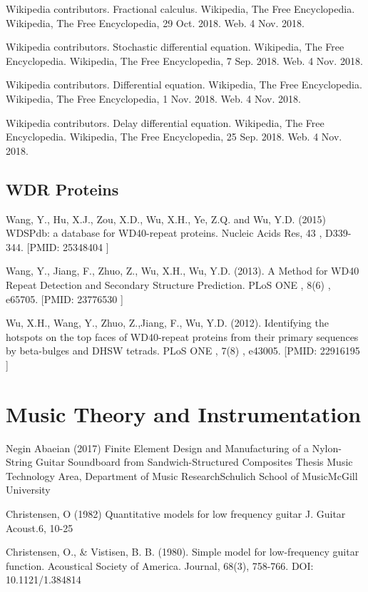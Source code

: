 \begin{thebibliography}{00}
 Wikipedia contributors. 
\newblock Fractional calculus.
\newblock Wikipedia, The Free Encyclopedia. Wikipedia, The Free Encyclopedia, 29 Oct. 2018. Web. 4 Nov. 2018. 

Wikipedia contributors. 
\newblock Stochastic differential equation.
\newblock Wikipedia, The Free Encyclopedia. Wikipedia, The Free Encyclopedia, 7 Sep. 2018. Web. 4 Nov. 2018.

Wikipedia contributors. 
\newblock Differential equation.
\newblock Wikipedia, The Free Encyclopedia. Wikipedia, The Free Encyclopedia, 1 Nov. 2018. Web. 4 Nov. 2018.  

 Wikipedia contributors. 
\newblock Delay differential equation.
\newblock Wikipedia, The Free Encyclopedia. Wikipedia, The Free Encyclopedia, 25 Sep. 2018. Web. 4 Nov. 2018. 

\subsection{WDR Proteins}

Wang, Y., Hu, X.J., Zou, X.D., Wu, X.H., Ye, Z.Q. and Wu, Y.D. (2015) 
\newblock WDSPdb: a database for WD40-repeat proteins. 
\newblock Nucleic Acids Res, 43 , D339-344. [PMID: 25348404 ]

Wang, Y., Jiang, F., Zhuo, Z., Wu, X.H., Wu, Y.D. (2013). 
\newblock A Method for WD40 Repeat Detection and Secondary Structure Prediction. 
\newblock PLoS ONE , 8(6) , e65705. [PMID: 23776530 ]

Wu, X.H., Wang, Y., Zhuo, Z.,Jiang, F., Wu, Y.D. (2012). 
\newblock Identifying the hotspots on the top faces of WD40-repeat proteins from their primary sequences by beta-bulges and DHSW tetrads. 
\newblock PLoS ONE , 7(8) , e43005. [PMID: 22916195 ] 

\section{Music Theory and Instrumentation}

 Negin Abaeian (2017)
\newblock Finite Element Design and Manufacturing of a Nylon-String Guitar Soundboard from Sandwich-Structured Composites
\newblock Thesis Music Technology Area, Department of Music ResearchSchulich School of MusicMcGill University

 Christensen, O (1982)
\newblock Quantitative models for low frequency guitar
\newblock J. Guitar Acoust.6, 10-25 

 Christensen, O., & Vistisen, B. B. (1980). 
\newblock Simple model for low-frequency guitar function. 
\newblock Acoustical Society of America. Journal, 68(3), 758-766. DOI: 10.1121/1.384814


\end{thebibliography}

